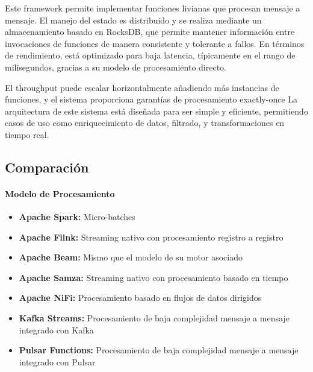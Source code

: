 Este framework permite implementar funciones livianas que procesan mensaje a mensaje. 
El manejo del estado es distribuido y se realiza mediante un almacenamiento basado en RocksDB, que permite mantener información 
entre invocaciones de funciones de manera consistente y tolerante a fallos. En términos de rendimiento, está optimizado para baja latencia, típicamente en el rango de milisegundos, 
gracias a su modelo de procesamiento directo. \newline

El throughput puede escalar horizontalmente añadiendo más instancias de funciones, y el sistema proporciona garantías de procesamiento exactly-once 
La arquitectura de este sistema está diseñada para ser simple y eficiente, permitiendo casos de uso como enriquecimiento de datos, filtrado, y transformaciones 
en tiempo real.


\newpage
\subsection{Comparación}

\paragraph{Modelo de Procesamiento}
\begin{itemize}
    \item \textbf{Apache Spark:} Micro-batches
    \item \textbf{Apache Flink:} Streaming nativo con procesamiento registro a registro
    \item \textbf{Apache Beam:} Mismo que el modelo de su motor asociado 
    \item \textbf{Apache Samza:} Streaming nativo con procesamiento basado en tiempo
    \item \textbf{Apache NiFi:} Procesamiento basado en flujos de datos dirigidos
    \item \textbf{Kafka Streams:} Procesamiento de baja complejidad mensaje a mensaje integrado con Kafka
    \item \textbf{Pulsar Functions:} Procesamiento de baja complejidad mensaje a mensaje integrado con Pulsar
\end{itemize}

